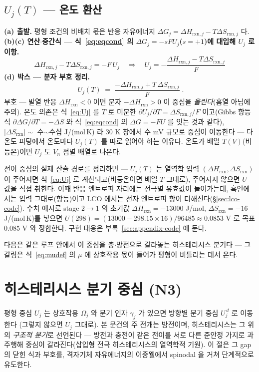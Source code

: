 \documentclass[11pt,a4paper]{article}
\newcommand{\rxn}{\mathrm{rxn}}
\begin{document}
\subsection{$U_j(T)$ — 온도 환산}
\textbf{(a) 출발.} 평형 조건의 비배치 몫은 반응 자유에너지 $\Delta G_j=\Delta H_{\rxn,j}-T\Delta S_{\rxn,j}$ 다.
\textbf{(b)(c) 연산$\cdot$중간식 — 식~\eqref{eq:eqcond} 의 $\Delta G_j=-sFU_j$($s=+1$)에 대입해 $U_j$ 로 이항.}
\begin{equation}
\Delta H_{\rxn,j}-T\Delta S_{\rxn,j}=-F\,U_j
\quad\Longrightarrow\quad
U_j=-\frac{\Delta H_{\rxn,j}-T\Delta S_{\rxn,j}}{F}
\label{eq:Ujmid}
\end{equation}
\textbf{(d) 박스 — 분자 부호 정리.}
\begin{equation}
\boxed{\;U_j(T)\;=\;\frac{-\Delta H_{\rxn,j}+T\,\Delta S_{\rxn,j}}{F}\;.}
\label{eq:Uj}
\end{equation}
부호 — 발열 반응
$\Delta H_\rxn<0$ 이면 분자 $-\Delta H_\rxn>0$ 이 중심을 \emph{올린다}(흡열 아님에 주의). 온도 의존은 식~\eqref{eq:Uj} 를
$T$ 로 미분한 $\partial U_j/\partial T=\Delta S_{\rxn,j}/F$ 이고(Gibbs 항등식 $\partial\Delta G/\partial T=-\Delta S$ 와
식~\eqref{eq:eqcond} 의 $\Delta G=-FU$ 를 잇는 것과 같다), $|\Delta S_\rxn|\sim$ 수$\sim$수십 J/(mol\,K) 라 $30$ K
창에서 수 mV 규모로 중심이 이동한다 — 다온도 피팅에서 온도마다 $U_j(T)$ 를 따로 읽어야 하는 이유다. 온도가 배열
$T(V)$(비등온)이면 $U_j$ 도 $V_n$ 점별 배열로 나온다.

전이 중심의 실제 산출 경로를 정리하면 — $U_j(T)$ 는 열역학 입력 $(\Delta H_\rxn,\Delta S_\rxn)$ 이 주어지면
식~\eqref{eq:Uj} 로 계산되고(비등온이면 배열 $T$ 그대로), 주어지지 않으면 $U$ 값을 직접 취한다. 이때
반응 엔트로피 자리에는 전극별 유효값이 들어가는데, 흑연에서는 입력 그대로(항등)이고 LCO 에서는 전자
엔트로피 항이 더해진다(\S\ref{sec:lco-code}). 수치 예시로 stage $2\to1$ 의 초기값
$\Delta H_\rxn=-13000$ J/mol, $\Delta S_\rxn=-16$ J/(mol\,K)를 넣으면
$U(298)=(13000-298.15\times16)/96485\approx0.0853$ V 로 목표 $0.085$ V 와 정합한다. 구현 대응은
부록~\ref{sec:appendix-code} 에 둔다.

다음은 같은 루프 안에서 이 중심을 충$\cdot$방전으로 갈라놓는 히스테리시스 분기다 — 그 갈림은 식~\eqref{eq:mudef} 의
$\mu$ 에 상호작용 몫이 들어가 평형이 비틀리는 데서 온다.

\section{히스테리시스 분기 중심 (N3)}\label{sec:hys}
평형 중심 $U_j$ 는 상호작용 $\Omega_j$ 와 분기 인자 $\gamma_j$ 가 있으면 방향별 분기 중심 $U_j^{\,d}$ 로 이동한다
(그렇지 않으면 $U_j$ 그대로). 본 문건의 주 전개는 방전이며, 히스테리시스는 그 위의 \emph{구조적 분기}로 선언된다 — 방전과 충전이
같은 전이를 서로 다른 준안정 가지로 과주행해 중심이 갈라진다(삽입형 전극 히스테리시스의 열역학적 기원\cite{dreyer2010}).
이 절은 그 gap 의 닫힌 식과 부호를, 격자기체 자유에너지의
이중웰에서 spinodal 을 거쳐 단계적으로 유도한다.
\end{document}
